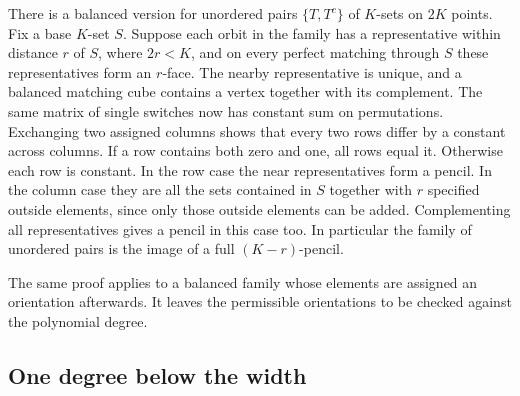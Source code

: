 \documentclass[11pt,letterpaper]{article}
\numberwithin{equation}{section}
\begin{document}
There is a balanced version for unordered pairs $\{T,T^c\}$ of $K$-sets on $2K$ points. Fix a
base $K$-set $S$. Suppose each orbit in the family has a representative within distance $r$ of
$S$, where $2r<K$, and on every perfect matching through $S$ these representatives form an
$r$-face. The nearby representative is unique, and a balanced matching cube contains a vertex
together with its complement. The same matrix of single switches now has constant sum on
permutations. Exchanging two assigned columns shows that every two rows differ by a constant
across columns. If a row contains both zero and one, all rows equal it. Otherwise each row is
constant. In the row case the near representatives form a pencil. In the column case they are
all the sets contained in $S$ together with $r$ specified outside elements, since only those
outside elements can be added. Complementing all representatives gives a pencil in this case
too. In particular the family of unordered pairs is the image of a full $(K-r)$-pencil.

The same proof applies to a balanced family whose elements are assigned an orientation
afterwards. It leaves the permissible orientations to be checked against the polynomial
degree.

\subsection{One degree below the width}\label{sec:one}
\end{document}
